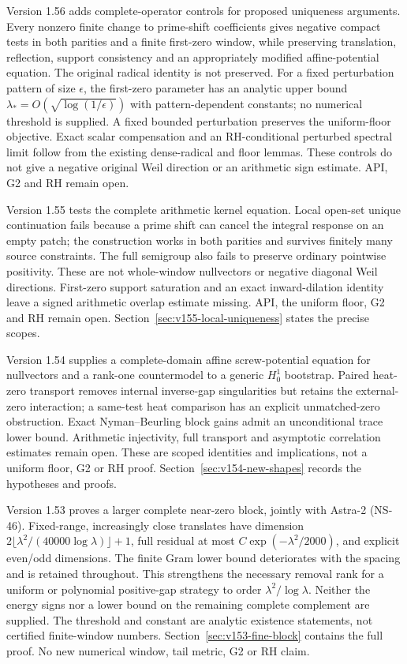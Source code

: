 \documentclass[11pt]{article}
\theoremstyle{remark}
\begin{document}
Version 1.56 adds complete-operator controls for proposed uniqueness
arguments. Every nonzero finite change to prime-shift coefficients gives
negative compact tests in both parities and a finite first-zero window,
while preserving translation, reflection, support consistency and an
appropriately modified affine-potential equation. The original radical
identity is not preserved. For a fixed perturbation pattern of size
$\epsilon$, the first-zero parameter has an analytic upper bound
$\lambda_*=O(\sqrt{\log(1/\epsilon)})$ with pattern-dependent constants;
no numerical threshold is supplied. A fixed bounded perturbation preserves
the uniform-floor objective. Exact scalar compensation and an RH-conditional
perturbed spectral limit follow from the existing dense-radical and floor
lemmas. These controls do not give a negative original Weil direction or
an arithmetic sign estimate. API, G2 and RH remain open.

Version 1.55 tests the complete arithmetic kernel equation. Local open-set
unique continuation fails because a prime shift can cancel the integral
response on an empty patch; the construction works in both parities and
survives finitely many source constraints. The full semigroup also fails
to preserve ordinary pointwise positivity. These are not whole-window
nullvectors or negative diagonal Weil directions. First-zero support
saturation and an exact inward-dilation identity leave a signed arithmetic
overlap estimate missing. API, the uniform floor, G2 and RH remain open.
Section~\ref{sec:v155-local-uniqueness} states the precise scopes.

Version 1.54 supplies a complete-domain affine screw-potential equation
for nullvectors and a rank-one countermodel to a generic $H_0^1$ bootstrap.
Paired heat-zero transport removes internal inverse-gap singularities but
retains the external-zero interaction; a same-test heat comparison has an
explicit unmatched-zero obstruction. Exact Nyman--Beurling block gains admit
an unconditional trace lower bound. Arithmetic injectivity, full transport
and asymptotic correlation estimates remain open. These are scoped identities
and implications, not a uniform floor, G2 or RH proof.
Section~\ref{sec:v154-new-shapes} records the hypotheses and proofs.

Version 1.53 proves a larger complete near-zero block, jointly with
Astra-2 (NS-46). Fixed-range, increasingly close translates have dimension
$2\lfloor\lambda^2/(40000\log\lambda)\rfloor+1$, full residual at most
$C\exp(-\lambda^2/2000)$, and explicit even/odd dimensions. The finite
Gram lower bound deteriorates with the spacing and is retained throughout.
This strengthens the necessary removal rank for a uniform or polynomial
positive-gap strategy
to order $\lambda^2/\log\lambda$. Neither the energy signs nor a lower
bound on the remaining complete complement are supplied. The threshold
and constant are analytic existence statements, not certified finite-window
numbers. Section~\ref{sec:v153-fine-block} contains the full proof.
No new numerical window, tail metric, G2 or RH claim.
\end{document}
